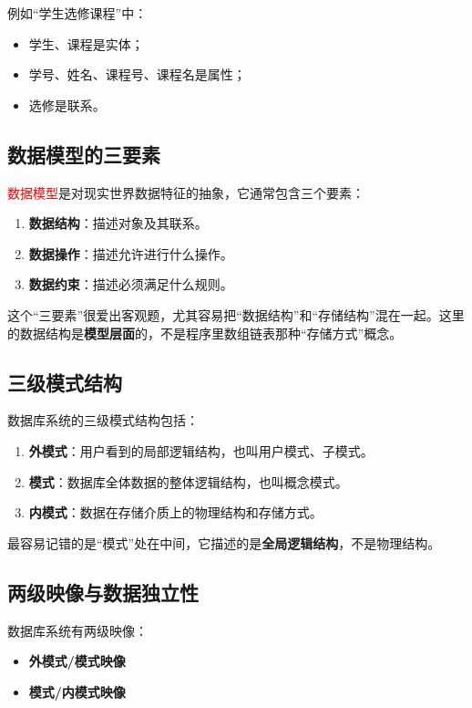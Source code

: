 \documentclass{../../note}
\begin{document}
例如“学生选修课程”中：

\begin{itemize}
  \item 学生、课程是实体；
  \item 学号、姓名、课程号、课程名是属性；
  \item 选修是联系。
\end{itemize}

\subsection{数据模型的三要素}

\textcolor{red}{数据模型}是对现实世界数据特征的抽象，它通常包含三个要素：

\begin{enumerate}
  \item \textbf{数据结构}：描述对象及其联系。
  \item \textbf{数据操作}：描述允许进行什么操作。
  \item \textbf{数据约束}：描述必须满足什么规则。
\end{enumerate}

这个“三要素”很爱出客观题，尤其容易把“数据结构”和“存储结构”混在一起。这里的数据结构是\textbf{模型层面}的，不是程序里数组链表那种“存储方式”概念。

\subsection{三级模式结构}

数据库系统的三级模式结构包括：

\begin{enumerate}
  \item \textbf{外模式}：用户看到的局部逻辑结构，也叫用户模式、子模式。
  \item \textbf{模式}：数据库全体数据的整体逻辑结构，也叫概念模式。
  \item \textbf{内模式}：数据在存储介质上的物理结构和存储方式。
\end{enumerate}

最容易记错的是“模式”处在中间，它描述的是\textbf{全局逻辑结构}，不是物理结构。

\subsection{两级映像与数据独立性}

数据库系统有两级映像：

\begin{itemize}
  \item \textbf{外模式/模式映像}
  \item \textbf{模式/内模式映像}
\end{itemize}
\end{document}
